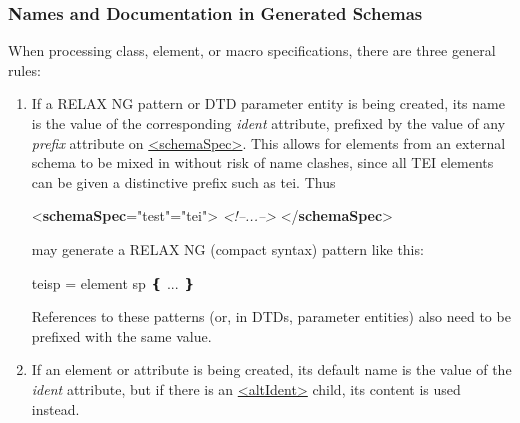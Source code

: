 \subsubsection[{Names and Documentation in Generated Schemas}]{Names and Documentation in Generated Schemas}\label{IM-naming}\par
When processing class, element, or macro specifications, there are three general rules: \begin{enumerate}
\item If a RELAX NG pattern or DTD parameter entity is being created, its name is the value of the corresponding {\itshape ident} attribute, prefixed by the value of any {\itshape prefix} attribute on \hyperref[TEI.schemaSpec]{<schemaSpec>}. This allows for elements from an external schema to be mixed in without risk of name clashes, since all TEI elements can be given a distinctive prefix such as tei\textunderscore . Thus \par\bgroup{}\exampleFont \begin{shaded}\noindent\mbox{}{<\textbf{schemaSpec}\hspace*{1em}{ident}="{test}"\hspace*{1em}{prefix}="{tei\textunderscore }">}\mbox{}\newline 
{}\mbox{}\newline 
\textit{<!--...-->}\mbox{}\newline 
{}\mbox{}\newline 
{</\textbf{schemaSpec}>}\end{shaded}\egroup\par  may generate a RELAX NG (compact syntax) pattern like this: \par\hfill\bgroup\exampleFont\vskip 10pt\begin{shaded}
\obeyspaces tei\textunderscore sp = element sp ❴ ... ❵\end{shaded}
\par\egroup 
 References to these patterns (or, in DTDs, parameter entities) also need to be prefixed with the same value.
\item If an element or attribute is being created, its default name is the value of the {\itshape ident} attribute, but if there is an \hyperref[TEI.altIdent]{<altIdent>} child, its content is used instead.

\end{enumerate}
